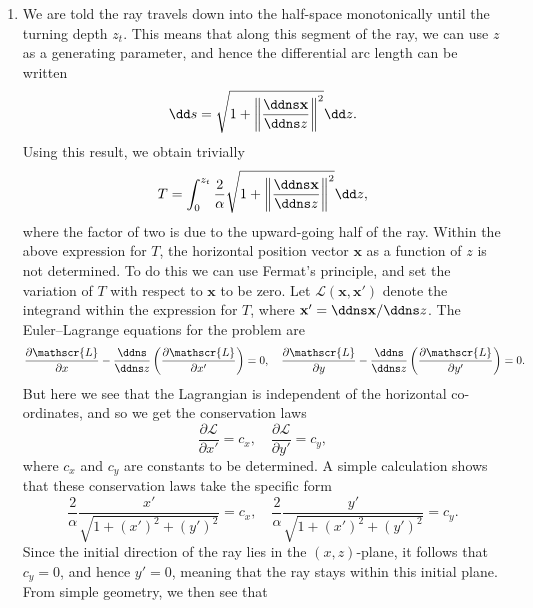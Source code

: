 \begin{enumerate}
\item We are told the ray travels down into the half-space monotonically until the turning depth $z_{t}$. This means that along this segment of the ray, we can use $z$ as a generating parameter, and hence the differential arc length can be written
\begin{equation*}
    \dd s=\sqrt{1+\left\|\frac{\ddns\mathbf{x}}{\ddns z}\right\|^{2}}\dd z.
\end{equation*}
Using this result, we obtain trivially
\begin{equation*}
    T=\int_{0}^{z_{t}}\frac{2}{\alpha}\sqrt{1+\left\|\frac{\ddns\mathbf{x}}{\ddns z}\right\|^{2}}\dd z,
\end{equation*}
where the factor of two is due to the upward-going half of the ray. Within the above expression for $T$, the horizontal position vector $\mathbf{x}$ as a function of $z$ is not determined. To do this we can use Fermat's principle, and set the variation of $T$ with respect to $\mathbf{x}$ to be zero. Let $\mathscr{L}(\mathbf{x},\mathbf{x}')$ denote the integrand within the expression for $T$, where $\mathbf{x}'=\ddns\mathbf{x}/\ddns z$. The Euler--Lagrange equations for the problem are
\begin{equation*}
    \frac{\partial\mathscr{L}}{\partial x}-\frac{\ddns}{\ddns z}\left(\frac{\partial\mathscr{L}}{\partial x'}\right)=0, \quad \frac{\partial\mathscr{L}}{\partial y}-\frac{\ddns}{\ddns z}\left(\frac{\partial\mathscr{L}}{\partial y'}\right)=0.
\end{equation*}
But here we see that the Lagrangian is independent of the horizontal co-ordinates, and so we get the conservation laws
\begin{equation*}
    \frac{\partial\mathscr{L}}{\partial x'}=c_{x}, \quad \frac{\partial\mathscr{L}}{\partial y'}=c_{y},
\end{equation*}
where $c_{x}$ and $c_{y}$ are constants to be determined. A simple calculation shows that these conservation laws take the specific form
\begin{equation*}
    \frac{2}{\alpha}\frac{x'}{\sqrt{1+(x')^{2}+(y')^{2}}}=c_{x},\quad \frac{2}{\alpha}\frac{y'}{\sqrt{1+(x')^{2}+(y')^{2}}}=c_{y}.
\end{equation*}
Since the initial direction of the ray lies in the $(x,z)$-plane, it follows that $c_{y}=0$, and hence $y'=0$, meaning that the ray stays within this initial plane. From simple geometry, we then see that
\begin{equation*}

\end{equation*}
\end{enumerate}
